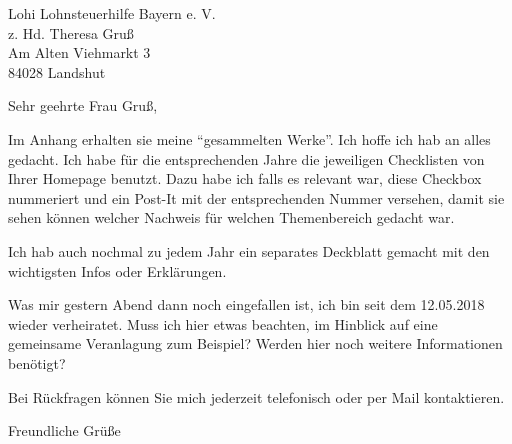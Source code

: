 \documentclass[version=last, Briefvorlage]{scrlttr2}
\begin{document}
%
\begin{letter}{%
Lohi Lohnsteuerhilfe Bayern e. V. \\
z. Hd. Theresa Gruß \\
Am Alten Viehmarkt 3 \\
84028 Landshut \\
	}
	\opening{Sehr geehrte Frau Gruß,}
	Im Anhang erhalten sie meine ``gesammelten Werke''. Ich hoffe ich hab an alles gedacht. Ich habe für die entsprechenden Jahre 
	die jeweiligen Checklisten von Ihrer Homepage benutzt. Dazu habe ich falls es relevant war, diese Checkbox nummeriert und ein 
	Post-It mit der entsprechenden Nummer versehen, damit sie sehen können welcher Nachweis für welchen Themenbereich gedacht war.
	
	Ich hab auch nochmal zu jedem Jahr ein separates Deckblatt gemacht mit den wichtigsten Infos oder Erklärungen. 
	
	Was mir gestern Abend dann noch eingefallen ist, ich bin seit dem 12.05.2018 wieder verheiratet. Muss ich hier etwas beachten, im Hinblick auf eine 
	gemeinsame Veranlagung zum Beispiel? Werden hier noch weitere Informationen benötigt?
	
	Bei Rückfragen können Sie mich jederzeit telefonisch oder per Mail kontaktieren.
	\closing{Freundliche Grüße}
\end{letter}
%
\end{document}
